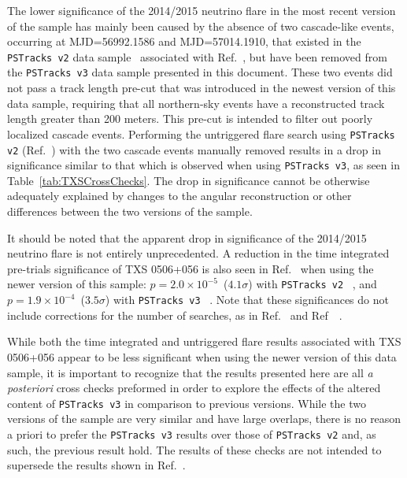 \documentclass[aps,10pt,prd,twocolumn,floats,letterpaper,showpacs,nofootinbib,bibnotes,notitlepage,superscriptaddress,floatfix]{revtex4-1}
\newcommand{\MA}[1]{{\color{black}#1}}
\begin{document}
The lower significance of the 2014/2015 neutrino flare in the most recent version of the sample has mainly been caused by the absence of two cascade-like events, occurring at MJD=56992.1586 and MJD=57014.1910, that existed in the {\tt PSTracks v2} data sample~\cite{IceCube:2019} associated with Ref.~\cite{IceCube:2018cha}, but have been removed from the {\tt PSTracks v3} data sample presented in this document. These two events did not pass a track length pre-cut that was introduced in the newest version of this data sample, requiring that all northern-sky events have a reconstructed track length greater than 200 meters. This pre-cut is intended to filter out poorly localized cascade events. Performing the untriggered flare search using {\tt PSTracks v2} (Ref.~\cite{IceCube:2019}) with the two cascade events manually removed results in a drop in significance similar to that which is observed when using {\tt PSTracks v3}, as seen in Table~\ref{tab:TXSCrossChecks}. The drop in significance cannot be otherwise adequately explained by changes to the angular reconstruction or other differences between the two versions of the sample. 

It should be noted that the apparent drop in significance of the 2014/2015 neutrino flare is not entirely unprecedented. A reduction in the time integrated pre-trials significance of TXS 0506+056 is also seen in Ref.~\cite{Aartsen:2019fau} when using the newer version of this sample: $p=2.0 \times 10^{-5}$~($4.1\sigma$) with \MA{\tt PSTracks v2} ~\cite{IceCube:2018cha}, and $p=1.9 \times 10^{-4}$~($3.5\sigma$) with \MA{\tt PSTracks v3} ~\cite{Aartsen:2019fau}. Note that these significances do not include corrections for the number of searches, as in Ref.~\cite{Aartsen:2019fau} and Ref~~\cite{IceCube:2018cha}.
 
 While both the time integrated and untriggered flare results associated with TXS 0506+056 appear to be less significant when using the newer version of this data sample, it is important to recognize that the results presented here are all \textit{a posteriori} cross checks preformed in order to explore the effects of the altered content of \MA{\tt PSTracks v3} in comparison to previous versions. While the two versions of the sample are very similar and have large overlaps, there is no reason a priori to prefer the \MA{\tt PSTracks v3} results over those of \MA{\tt PSTracks v2} and, as such, the previous result hold.
 The results of these checks are not intended to supersede the results shown in Ref.~\cite{IceCube:2018cha}.
\end{document}
